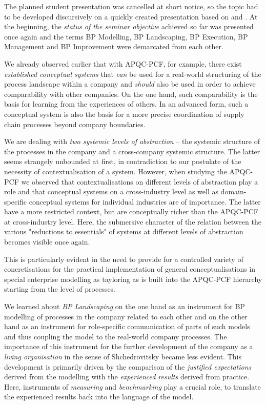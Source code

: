 \documentclass[11pt,a4paper]{article}
\begin{document}
The planned student presentation was cancelled at short notice, so the topic
had to be developed discursively on a quickly created presentation based on
\cite{Lindskog2018} and \cite{Rosemann2020}. At the beginning, the
\emph{status of the seminar objective} achieved so far was presented once
again and the terms BP Modelling, BP Landscaping, BP Execution, BP Management
and BP Improvement were demarcated from each other.

We already observed earlier that with APQC-PCF, for example, there exist
\emph{established conceptual systems} that \emph{can} be used for a real-world
structuring of the process landscape within a company and \emph{should} also
be used in order to achieve comparability with other companies. On the one
hand, such comparability is the basis for learning from the experiences of
others. In an advanced form, such a conceptual system is also the basis for a
more precise coordination of supply chain processes beyond company boundaries.

We are dealing with \emph{two systemic levels of abstraction} -- the systemic
structure of the processes in the company and a cross-company systemic
structure. The latter seems strangely unbounded at first, in contradiction to
our postulate of the necessity of contextualisation of a system. However, when
studying the APQC-PCF we observed that contextualisations on different levels
of abstraction play a role and that conceptual systems on a cross-industry
level as well as domain-specific conceptual systems for individual industries
are of importance. The latter have a more restricted context, but are
conceptually richer than the APQC-PCF at cross-industry level. Here, the
submersive character of the relation between the various "reductions to
essentials" of systems at different levels of abstraction becomes visible once
again.

This is particularly evident in the need to provide for a controlled variety
of concretisations for the practical implementation of general
conceptualisations in special enterprise modelling as tayloring as is built
into the APQC-PCF hierarchy starting from the level of processes.

We learned about \emph{BP Landscaping} on the one hand as an instrument for BP
modelling of processes in the company related to each other and on the other
hand as an instrument for role-specific communication of parts of such models
and thus coupling the model to the real-world company processes. The
importance of this instrument for the further development of the company as a
\emph{living organisation} in the sense of Shchedrovitsky became less evident.
This development is primarily driven by the comparison of the \emph{justified
  expectations} derived from the modelling with the \emph{experienced results}
derived from practice. Here, instruments of \emph{measuring} and
\emph{benchmarking} play a crucial role, to translate the experienced results
back into the language of the model.
\end{document}

